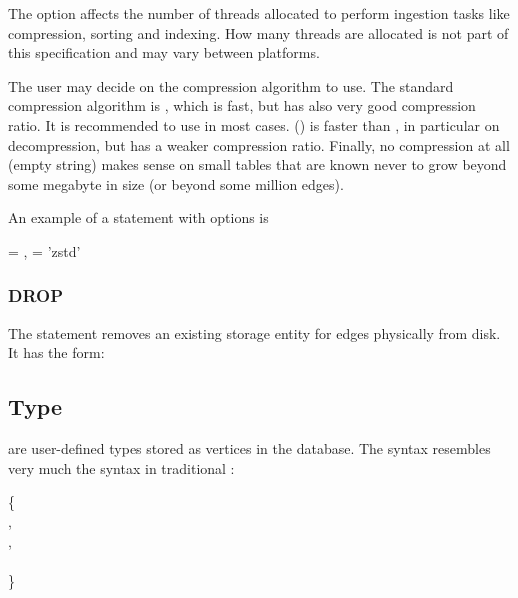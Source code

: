 The option  affects the number of threads
allocated to perform ingestion tasks
like compression, sorting and indexing.
How many threads are allocated
is not part of this specification
and may vary between platforms.

The user may decide on the compression algorithm to use.
The standard compression algorithm is ,
which is fast, but has also very good compression ratio.
It is recommended to use  in most cases.
 () is faster than ,
in particular on decompression,
but has a weaker compression ratio.
Finally, no compression at all (empty string)
makes sense on small tables
that are known never to grow beyond some megabyte in size
(or beyond some million edges).

An example of a  statement with options is

 
  = ,
               = 'zstd'

\subsubsection{DROP}
The  statement removes
an existing storage entity for edges
physically from disk.
It has the form:

 


\subsection{Type}
 are user-defined types
stored as vertices in the database.
The syntax resembles very much
the  syntax
in traditional \sql:

\begin{minipage}{\textwidth}
  \{ \\
\hspace*{1cm}  , \\
\hspace*{1cm} , \\
\hspace*{1cm}  \\
\}
\end{minipage}

